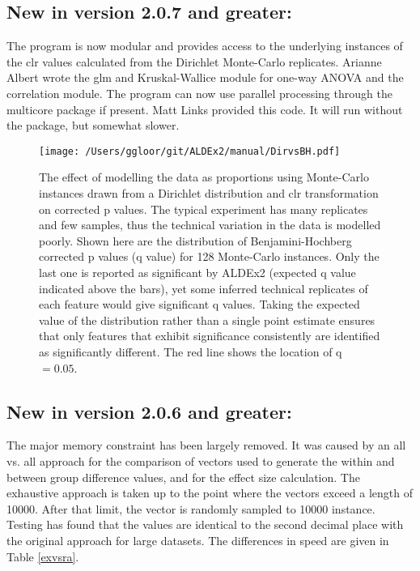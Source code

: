 \documentclass[11pt]{article}
\begin{document}
\subsection{New in version 2.0.7 and greater:} The program is now modular and provides access to the underlying instances of the clr values calculated from the Dirichlet Monte-Carlo replicates. Arianne Albert wrote the glm and Kruskal-Wallice module for one-way ANOVA and the correlation module. The program can now use parallel processing through the multicore package if present. Matt Links provided this code. It will run without the package, but somewhat slower. 

\begin{wrapfigure}{r}{0.6\textwidth}\vspace{-2cm}
\begin{center}
\texttt{[image: /Users/ggloor/git/ALDEx2/manual/DirvsBH.pdf]}
\vspace{-1cm}
\caption{The effect of modelling the data as proportions using Monte-Carlo instances drawn from a Dirichlet distribution and clr transformation on corrected p values. The typical experiment has many replicates and few samples, thus the technical variation in the data is modelled poorly. Shown here are the distribution of Benjamini-Hochberg corrected p values (q value) for 128 Monte-Carlo instances. Only the last one is reported as significant by ALDEx2 (expected q value indicated above the bars), yet some inferred technical replicates of each feature would give significant q values. Taking the expected value of the distribution rather than a single point estimate ensures that only features that exhibit significance consistently are identified as significantly different. The  red line shows the location of q\ $=0.05$. }
\label{dirvsbh}
\end{center}\vspace{-2cm}
\end{wrapfigure}
\newpage
\subsection{New in version 2.0.6 and greater:} The major memory constraint has been largely removed. It was caused by an all vs. all approach for the comparison of vectors used to generate the within and between group difference values, and for the effect size calculation. The exhaustive approach is taken up to the point where the vectors exceed a length of 10000. After that limit, the vector is randomly sampled to 10000 instance. Testing has found that the values are identical to the second decimal place with the original approach for large datasets. The differences in speed are given in Table \ref{exvsra}.
\end{document}
